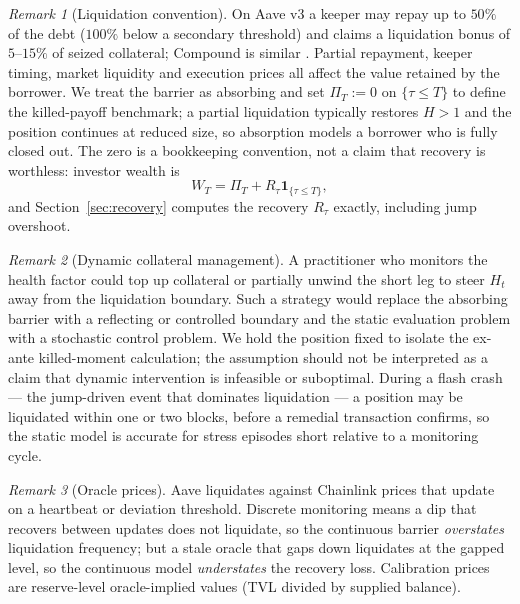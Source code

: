 \documentclass[11pt]{article}
\newcommand{\one}{\mathbf{1}}
\theoremstyle{plain}
\theoremstyle{definition}
\theoremstyle{remark}
\newtheorem{remark}{Remark}
\begin{document}
\begin{remark}[Liquidation convention]\label{rem:liquidation}
On Aave v3 a keeper may repay up to $50\%$ of the debt ($100\%$ below a secondary threshold) and
claims a liquidation bonus of $5$--$15\%$ of seized collateral; Compound is similar
\citep{Qin2021,HeimbachHuang2024}. Partial repayment, keeper timing, market liquidity and execution
prices all affect the value retained by the borrower. We treat the barrier as absorbing and set
$\Pi_T:=0$ on $\{\tau\le T\}$ to define the killed-payoff benchmark; a partial liquidation typically
restores $H>1$ and the position continues at reduced size, so absorption models a borrower who is
fully closed out. The zero is a bookkeeping convention, not a claim that recovery is worthless:
investor wealth is
\begin{equation}\label{eq:wealth}
W_T=\Pi_T+R_\tau\one_{\{\tau\le T\}},
\end{equation}
and Section~\ref{sec:recovery} computes the recovery $R_\tau$ exactly, including jump overshoot.
\end{remark}

\begin{remark}[Dynamic collateral management]\label{rem:dynamic}
A practitioner who monitors the health factor could top up collateral or partially unwind
the short leg to steer $H_t$ away from the liquidation boundary.
Such a strategy would replace the absorbing barrier with a reflecting or controlled
boundary and the static evaluation problem with a stochastic control problem. We hold the
position fixed to isolate the ex-ante killed-moment calculation; the assumption should not
be interpreted as a claim that dynamic intervention is infeasible or suboptimal. During a flash
crash --- the jump-driven event that dominates liquidation --- a position may be liquidated within
one or two blocks, before a remedial transaction confirms, so the static model is accurate for
stress episodes short relative to a monitoring cycle.
\end{remark}

\begin{remark}[Oracle prices]\label{rem:oracle}
Aave liquidates against Chainlink prices that update on a heartbeat or deviation threshold. Discrete
monitoring means a dip that recovers between updates does not liquidate, so the continuous barrier
\emph{overstates} liquidation frequency; but a stale oracle that gaps down liquidates at the gapped
level, so the continuous model \emph{understates} the recovery loss. Calibration prices are
reserve-level oracle-implied values (TVL divided by supplied balance).
\end{remark}
\end{document}
